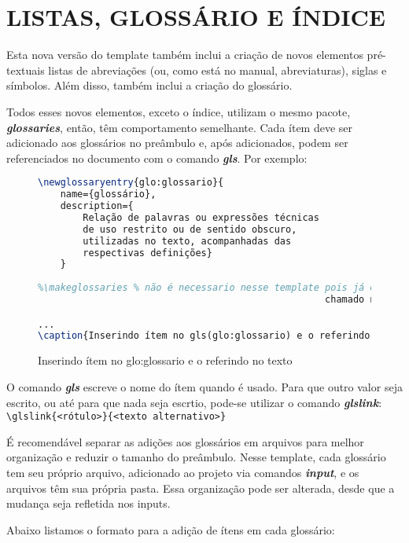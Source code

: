 \chapter{LISTAS, GLOSSÁRIO E ÍNDICE}\label{cap:listasEGlossario}

Esta nova versão do template também inclui a criação de novos elementos pré-textuais listas de abreviações (ou, como está no manual, abreviaturas), siglas e símbolos. Além disso, também inclui a criação do glossário.

Todos esses novos elementos, exceto o índice, utilizam o mesmo pacote, \textit{\textbf{glossaries}}, então, têm comportamento semelhante. Cada ítem deve ser adicionado aos glossários no preâmbulo e, após adicionados, podem ser referenciados no documento com o comando \textit{\textbf{gls}}. Por exemplo:
	
\begin{figure}[!htb]
	\centering
	\caption{Inserindo ítem no \gls{glo:glossario} e o referindo no texto} %
	\begin{lstlisting}[language=tex]
\newglossaryentry{glo:glossario}{
	name={glossário}, 
	description={
		Relação de palavras ou expressões técnicas 
		de uso restrito ou de sentido obscuro, 
		utilizadas no texto, acompanhadas das 
		respectivas definições}
	}
		
%\makeglossaries % não é necessario nesse template pois já é 
                                                   chamado na classe

...
\caption{Inserindo ítem no gls(glo:glossario) e o referindo no texto}
	\end{lstlisting}
	\label{fig:exemploglossario1} %
\end{figure}

O comando \textit{\textbf{gls}} escreve o nome do ítem quando é usado. Para que outro valor seja escrito, ou até para que nada seja escrtio, pode-se utilizar o comando \textit{\textbf{glslink}}:\\
\verb|\glslink{<rótulo>}{<texto alternativo>}|

É recomendável separar as adições aos glossários em arquivos para melhor organização e reduzir o tamanho do preâmbulo. Nesse template, cada glossário tem seu próprio arquivo, adicionado ao projeto via comandos \textit{\textbf{input}}, e os arquivos têm sua própria pasta. Essa organização pode ser alterada, desde que a mudança seja refletida nos inputs.

\newpage
Abaixo listamos o formato para a adição de ítens em cada glossário:

